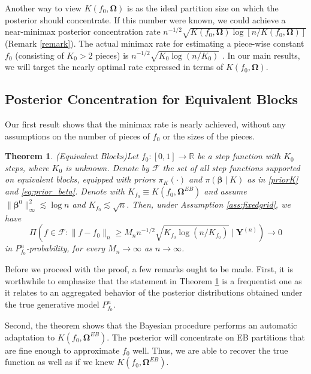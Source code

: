 \documentclass{article}
\newcommand{\1}{\mathbb{I}}
\newcommand{\bm}[1]{\boldsymbol{#1}}
\newcommand{\Y}{\bm{Y}}
\def\b{\bm{\beta}}
\def\Y{\bm{Y}}
\def\b{\bm{\beta}}
\newtheorem{theorem}{Theorem}[section]
\theoremstyle{assumption}
\begin{document}
Another way to view $K(f_0,\bm{\Omega})$ is as the ideal partition size on which the posterior should concentrate. If this number were known, we could achieve a near-minimax posterior concentration rate $n^{-1/2}\sqrt{K(f_0,\bm{\Omega})\log[n/K(f_0,\bm{\Omega})]}$ (Remark \ref{remark}).  The actual minimax rate for estimating a  piece-wise constant $f_0$ (consisting of $K_0>2$ pieces) is $n^{-1/2}\sqrt{K_0\log (n/K_0)}$ \cite{Gao}. 
In our main results, we will target the nearly optimal rate expressed in terms of $K(f_0,\bm{\Omega})$.  

\subsection{Posterior Concentration for Equivalent Blocks}
Our first result shows that the minimax rate is nearly achieved, without any assumptions on the number of pieces of $f_0$ or the sizes of the pieces. 

 
 

\begin{theorem}(Equivalent Blocks)\label{thm:main_step}
Let $f_0 : [0,1] \to \mathbb{R}$ be a step function with $K_0$ steps, where $K_0$ is unknown. Denote by $\mathcal{F}$ the set of all step functions supported on equivalent blocks, equipped with priors $\pi_K(\cdot)$  and $\pi(\b \mid K)$ as in \eqref{priorK} and \eqref{eq:prior_beta}.  Denote with $K_{f_0}\equiv K(f_0,\bm{\Omega}^{EB})$ and assume $\|\b^0\|^2_\infty\lesssim\log n$ and $K_{f_0}\lesssim \sqrt{n}$. Then, under Assumption \ref{ass:fixedgrid}, we have 
\begin{equation}\label{eq:conc}
\Pi\left( f \in \mathcal{F}: \|f - f_0\|_n \geq M_n n^{-1/2}\sqrt{K_{f_0}\log{(n/K_{f_0})}} \mid \Y^{(n)}\right) \to 0
\end{equation}
in $P_{f_0}^n$-probability, for every $M_n \to \infty$ as $n \to \infty$.
\end{theorem}

Before we proceed with the proof,  a few remarks ought to be made. First, it is worthwhile to emphasize that the statement in Theorem \ref{thm:main_step} is a frequentist one as it relates to an aggregated behavior of the posterior distributions obtained under the true generative model $P_{f_0}^n$. 

Second, the theorem shows that the Bayesian procedure performs an automatic adaptation to $K(f_0,\bm{\Omega}^{EB})$. The posterior will concentrate on  EB partitions that are fine enough to approximate $f_0$ well.  Thus, we are able to recover the true function as well as if we knew $K(f_0,\bm{\Omega}^{EB})$.  %
\end{document}
